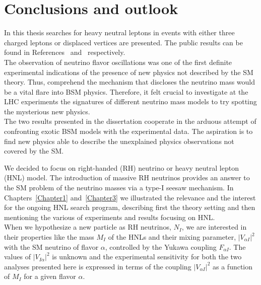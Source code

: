 
\chapter{Conclusions and outlook}\label{Chapter7} 

In this thesis searches for heavy neutral leptons in events with either three
charged leptons or displaced vertices are presented. The public
results can be found in References~\cite{Sirunyan:2018mtv} and~\cite{CMS-PAS-EXO-20-009} respectively.\\


The observation of neutrino flavor oscillations was one of the first 
definite experimental indications of the
presence of new physics not described by the SM theory. Thus, 
comprehend the mechanism that discloses the neutrino mass would be a
vital flare into BSM physics. Therefore, it felt crucial to investigate at the LHC
experiments the signatures of different neutrino mass models
to try spotting the mysterious new physics.\\
The two results presented in the dissertation cooperate in the arduous attempt of confronting exotic BSM
models with the experimental data. The aspiration is to find new
physics able to describe the unexplained
physics observations not covered by the SM. 

We decided to focus on right-handed (RH) neutrino or heavy neutral lepton (HNL)
model. The introduction of massive RH
neutrinos provides an answer to the SM problem of the
neutrino masses via a type-I seesaw mechanism.  
In Chapters~\ref{Chapter1} and~\ref{Chapter3} we illustrated
the relevance and the interest for the
ongoing HNL search program, describing first the theory setting 
and then mentioning the various of experiments and results
focusing on HNL.\\
When we hypothesize a new particle as RH neutrinos, $N_{I}$, we
are interested in their properties like the mass $M_I$ of the HNLs and
their mixing parameter, $|V_{\alpha I}|^2$  with the SM neutrino of flavor $\alpha$,
controlled by the Yukawa coupling $F_{\alpha I}$. The values of $|V_{I
  \alpha}|^2$ is unknown and the experimental
sensitivity for both the two analyses presented here is expressed in
terms of the coupling $|V_{\alpha I}|^2$
as a function of $M_I$ for a given flavor $\alpha$. 

